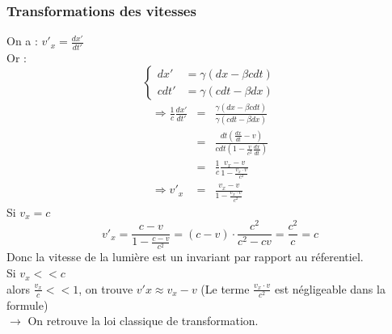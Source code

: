 \documentclass{article}
\begin{document}
\subsubsection{Transformations des vitesses}
On a : $v'_x = \frac{dx'}{dt'}$\\
Or : \\
\[
\begin{cases}
    dx' &= \gamma(dx - \beta c dt)\\
    cdt' &= \gamma(cdt - \beta dx)
\end{cases}
\]
\begin{eqnarray*}
    \Rightarrow \frac{1}{c} \frac{dx'}{dt'} &=& \frac{\gamma(dx - \beta c dt)}{\gamma(cdt - \beta dx)}\\
    &=& \frac{dt(\frac{dx}{dt} - v)}{cdt (1- \frac{v}{c^2}\frac{dx}{dt})}\\
    &=& \frac{1}{c} \frac{v_x - v}{1 - \frac{v_x \cdot v}{c^2}}\\
    \Rightarrow v'_x&=& \frac{v_x - v}{1 - \frac{v_x \cdot v}{c^2}}
\end{eqnarray*}
Si $v_x=c$
\begin{equation*}
    v'_x = \frac{c-v}{1- \frac{c-v}{c^2}} = (c-v) \cdot \frac{c^2}{c^2 - cv} = \frac{c^2}{c} = c
\end{equation*}
Donc la vitesse de la lumière est un invariant par rapport au réferentiel.\\
Si $v_x << c $\\
alors $\frac{v_x}{c}<<1$, on trouve $v'x \approx v_x -v$ (Le terme $\frac{v_x\cdot v}{c^2}$ est négligeable dans la formule)\\
$\rightarrow$ On retrouve la loi classique de transformation.
\end{document}
